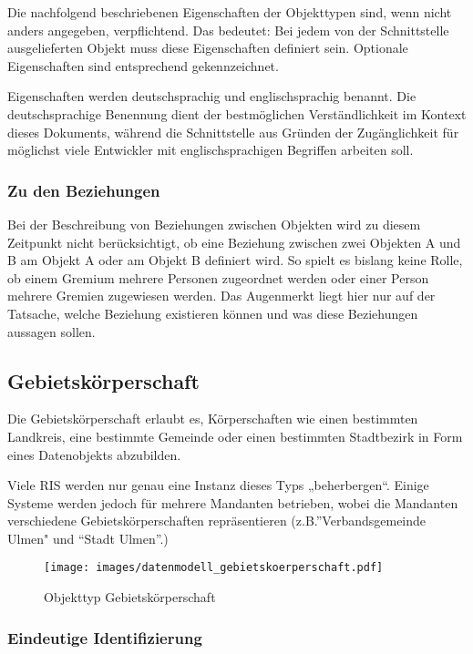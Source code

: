 \documentclass[,a4paper]{article}
\makeatletter
\def\maxwidth{\ifdim\Gin@nat@width>\linewidth\linewidth
\else\Gin@nat@width\fi}
\let\Oldincludegraphics\includegraphics
\renewcommand{\includegraphics}[1]{\Oldincludegraphics[width=\maxwidth]{#1}}
\makeatother
\begin{document}
Die nachfolgend beschriebenen Eigenschaften der Objekttypen sind, wenn
nicht anders angegeben, verpflichtend. Das bedeutet: Bei jedem von der
Schnittstelle ausgelieferten Objekt muss diese Eigenschaften definiert
sein. Optionale Eigenschaften sind entsprechend gekennzeichnet.

Eigenschaften werden deutschsprachig und englischsprachig benannt. Die
deutschsprachige Benennung dient der bestmöglichen Verständlichkeit im
Kontext dieses Dokuments, während die Schnittstelle aus Gründen der
Zugänglichkeit für möglichst viele Entwickler mit englischsprachigen
Begriffen arbeiten soll.

\subsubsection{Zu den Beziehungen}

Bei der Beschreibung von Beziehungen zwischen Objekten wird zu diesem
Zeitpunkt nicht berücksichtigt, ob eine Beziehung zwischen zwei Objekten
A und B am Objekt A oder am Objekt B definiert wird. So spielt es
bislang keine Rolle, ob einem Gremium mehrere Personen zugeordnet werden
oder einer Person mehrere Gremien zugewiesen werden. Das Augenmerkt
liegt hier nur auf der Tatsache, welche Beziehung existieren können und
was diese Beziehungen aussagen sollen.

\subsection{Gebietskörperschaft}

Die Gebietskörperschaft erlaubt es, Körperschaften wie einen bestimmten
Landkreis, eine bestimmte Gemeinde oder einen bestimmten Stadtbezirk in
Form eines Datenobjekts abzubilden.

Viele RIS werden nur genau eine Instanz dieses Typs „beherbergen``.
Einige Systeme werden jedoch für mehrere Mandanten betrieben, wobei die
Mandanten verschiedene Gebietskörperschaften repräsentieren
(z.B.''Verbandsgemeinde Ulmen" und ``Stadt Ulmen''.)

\begin{figure}[htbp]
\centering
\texttt{[image: images/datenmodell\_gebietskoerperschaft.pdf]}
\caption{Objekttyp Gebietskörperschaft}
\end{figure}

\subsubsection{Eindeutige Identifizierung}
\end{document}
